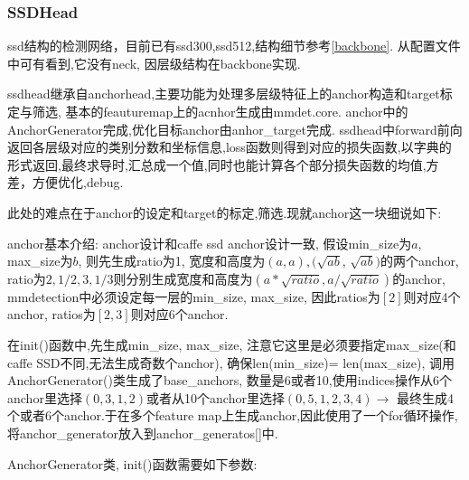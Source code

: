 \documentclass[UTF8]{ctexart}
\begin{document}
\subsubsection{SSDHead}
ssd结构的检测网络，目前已有ssd300,ssd512,结构细节参考\ref{backbone}. 从配置文件中可有看到,它没有neck,
因层级结构在backbone实现.

ssdhead继承自anchorhead,主要功能为处理多层级特征上的anchor构造和target标定与筛选,
基本的feauturemap上的acnhor生成由mmdet.core.
anchor中的AnchorGenerator完成,优化目标anchor由anhor\_target完成.
ssdhead中forward前向返回各层级对应的类别分数和坐标信息,loss函数则得到对应的损失函数,以字典的形式返回,最终求导时,汇总成一个值,同时也能计算各个部分损失函数的均值,方差，方便优化,debug.

此处的难点在于anchor的设定和target的标定,筛选.现就anchor这一块细说如下:

anchor基本介绍: anchor设计和caffe ssd anchor设计一致, 假设min\_size为$a$, max\_size为$b$, 则先生成ratio为1, 宽度和高度为$(a, a), (\sqrt{ab}$, 
$\sqrt{ab})$的两个anchor, ratio为$2, 1/2, 3, 1/3$则分别生成宽度和高度为$(a*\sqrt{ratio}, a/\sqrt{ratio})$的anchor, mmdetection中必须设定每一层的min\_size, max\_size, 因此ratios为$[2]$则对应4个anchor, ratios为$[2,3]$则对应6个anchor.

在init()函数中,先生成min\_size, max\_size, 注意它这里是必须要指定max\_size(和caffe SSD不同,无法生成奇数个anchor), 确保len(min\_size)=
len(max\_size), 调用AnchorGenerator()类生成了base\_anchors, 数量是6或者10,使用indices操作从6个anchor里选择$(0, 3, 1, 2)$或者从10个anchor里选择$(0, 5, 1, 2, 3, 4) $$\rightarrow$ 最终生成4个或者6个anchor.于在多个feature map上生成anchor,因此使用了一个for循环操作, 将anchor\_generator放入到anchor\_generatos[]中.


AnchorGenerator类, init()函数需要如下参数:
\end{document}
